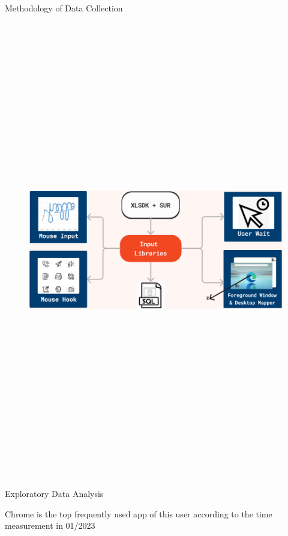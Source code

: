 \documentclass[final]{beamer}
\newlength{\colwidth}
\begin{document}
\begin{frame}[t]
\begin{columns}[t]
\begin{column}{\colwidth}
\begin{alertblock}{\huge{Methodology of Data Collection}}
          \begin{figure}
          \includegraphics[width=0.96 \textwidth, height=20cm]{data-collection3.jpeg}
          
          \end{figure}
      \end{alertblock}

      \begin{block}{\huge{Exploratory Data Analysis}}

        {\fontsize{37pt}{44.4pt} \selectfont Chrome is the top frequently used app of this user according to the time measurement in 01/2023}


\end{block}
\end{column}
\end{columns}
\end{frame}
\end{document}

